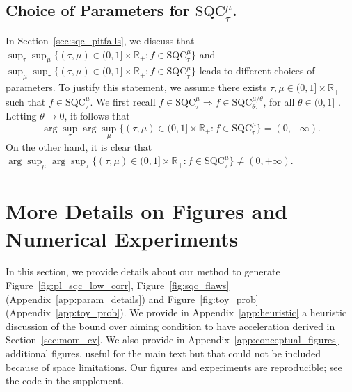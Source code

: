 \documentclass{article}
\def\R{{\mathbb{R}}}
\newcommand{\bpar}[1]{\left(#1\right)}
\newcommand{\sqc}{\text{SQC}_{\tau}^{\mu}}
\newcommand{\sqcf}[2]{\text{SQC}_{#1}^{#2}}
\theoremstyle{plain}
\theoremstyle{definition}
\theoremstyle{remark}
\begin{document}
\subsection{Choice of Parameters for $\sqc$.}\label{app:choice_param_sqc}
In Section~\ref{sec:sqc_pitfalls}, we discuss that $ \sup_\tau  \sup_\mu \{(\tau,\mu) \in (0,1] \times \R_+: f \in \sqc \}$ and $\sup_\mu \sup_\tau \{(\tau,\mu) \in (0,1] \times \R_+: f \in \sqc \}$ leads to different choices of parameters. To justify this statement, we assume there exists $\tau, \mu \in (0,1]\times \R_+$ such that $f \in \sqc$. We first recall
$f \in \sqcf{\tau}{\mu} \Rightarrow f \in \sqcf{\theta \tau}{\mu/\theta}$, for all $\theta \in (0,1]$ \cite[Observation 5]{hinder2020near}. Letting $\theta \to 0$, it follows that
$$\arg \sup_\tau \arg \sup_\mu \{ (\tau,\mu) \in (0,1] \times \R_+:f \in \sqc \} = (0,+\infty).$$
On the other hand, it is clear that
$\arg \sup_\mu \arg \sup_\tau \{ (\tau,\mu)\in (0,1] \times \R_+ : f \in \sqc \} \neq (0,+\infty)$.
\section{More Details on Figures and Numerical Experiments}
In this section, we provide details about our method to generate Figure~\ref{fig:pl_sqc_low_corr}, Figure~\ref{fig:sqc_flaws} (Appendix~\ref{app:param_details}) and Figure~\ref{fig:toy_prob} (Appendix~\ref{app:toy_prob}). We provide in Appendix~\ref{app:heuristic} a heuristic discussion of the bound over aiming condition to have acceleration derived in Section~\ref{sec:mom_cv}. We also provide in Appendix~\ref{app:conceptual_figures} additional figures, useful for the main text but that could not be included because of space limitations. Our figures and experiments are reproducible; see the code in the supplement.
\end{document}
